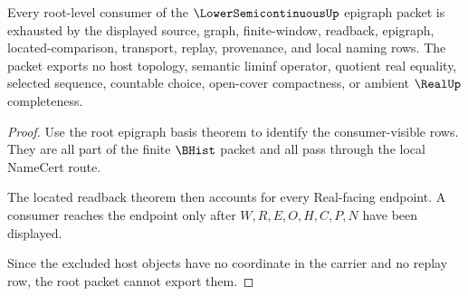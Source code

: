 \begin{theorem}
\label{thm:lowersemicontinuous-root-nonescape}
Every root-level consumer of the $\LowerSemicontinuousUp$ epigraph packet is exhausted by the displayed source, graph, finite-window, readback, epigraph, located-comparison, transport, replay, provenance, and local naming rows. The packet exports no host topology, semantic liminf operator, quotient real equality, selected sequence, countable choice, open-cover compactness, or ambient $\RealUp$ completeness.
\end{theorem}
\begin{proof}
Use the root epigraph basis theorem to identify the consumer-visible rows. They are all part of the finite $\BHist$ packet and all pass through the local NameCert route.

The located readback theorem then accounts for every Real-facing endpoint. A consumer reaches the endpoint only after $W,R,E,O,H,C,P,N$ have been displayed.

Since the excluded host objects have no coordinate in the carrier and no replay row, the root packet cannot export them.
\end{proof}

